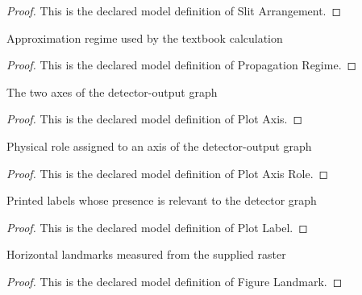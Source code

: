 \begin{proof}
  This is the declared model definition of Slit Arrangement.
\end{proof}
\begin{definition}
  \label{def:physics:phyx-mini-0643:phyxminiproblems-problemphyxmini0643-propagationregime}
  Approximation regime used by the textbook calculation
\end{definition}
\begin{proof}
  This is the declared model definition of Propagation Regime.
\end{proof}
\begin{definition}
  \label{def:physics:phyx-mini-0643:phyxminiproblems-problemphyxmini0643-plotaxis}
  The two axes of the detector-output graph
\end{definition}
\begin{proof}
  This is the declared model definition of Plot Axis.
\end{proof}
\begin{definition}
  \label{def:physics:phyx-mini-0643:phyxminiproblems-problemphyxmini0643-plotaxisrole}
  Physical role assigned to an axis of the detector-output graph
\end{definition}
\begin{proof}
  This is the declared model definition of Plot Axis Role.
\end{proof}
\begin{definition}
  \label{def:physics:phyx-mini-0643:phyxminiproblems-problemphyxmini0643-plotlabel}
  Printed labels whose presence is relevant to the detector graph
\end{definition}
\begin{proof}
  This is the declared model definition of Plot Label.
\end{proof}
\begin{definition}
  \label{def:physics:phyx-mini-0643:phyxminiproblems-problemphyxmini0643-figurelandmark}
  Horizontal landmarks measured from the supplied raster
\end{definition}
\begin{proof}
  This is the declared model definition of Figure Landmark.
\end{proof}
